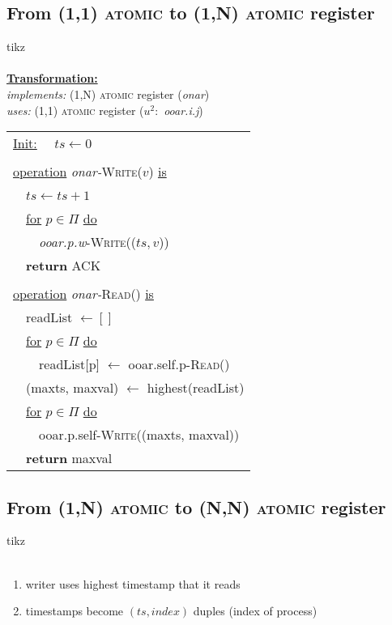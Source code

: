 \documentclass{article}
\begin{document}
\begin{adjustwidth}{2em}{2em}
		\subsection{From (1,1) \textsc{atomic} to (1,N) \textsc{atomic} register}
		\begin{adjustwidth}{2em}{2em}
			tikz \\
			\hfill \\
			\underline{\textbf{Transformation:}} \\
			\textit{implements:} (1,N) \textsc{atomic} register (\textit{onar}) \\
			\textit{uses:} (1,1) \textsc{atomic} register ($u^2 :$ \textit{ooar.i.j}) \\
			\begin{tabular}{l}
				\underline{Init:}
				\ \ $ts \leftarrow 0$ \\
				\\
				\underline{operation} \textit{onar-}\textsc{Write}($v$) \underline{is} \\
				\ \ $ts \leftarrow ts + 1$ \\
				\ \ \underline{for} $p \in \Pi$ \underline{do} \\
				\ \ \ \ \textit{ooar.p.w}-\textsc{Write}(($ts,v$)) \\
				\ \ \textbf{return} \textsc{ACK} \\
				\\
				\underline{operation} \textit{onar-}\textsc{Read}() \underline{is} \\
				\ \ readList $\leftarrow []$ \\
				\ \ \underline{for} $p \in \Pi$ \underline{do} \\
				\ \ \ \ readList[p] $\leftarrow$ ooar.self.p-\textsc{Read}() \\
				\ \ (maxts, maxval) $\leftarrow$ highest(readList) \\
				\ \ \underline{for} $p \in \Pi$ \underline{do} \\
				\ \ \ \ ooar.p.self-\textsc{Write}((maxts, maxval)) \\
				\ \ \textbf{return} maxval
			\end{tabular}
		\end{adjustwidth}
		\subsection{From (1,N) \textsc{atomic} to (N,N) \textsc{atomic} register}
		\begin{adjustwidth}{2em}{2em}
			tikz \\
			\hfill \\
			\begin{enumerate}[-]
				\item writer uses highest timestamp that it reads
				\item timestamps become $(ts, \textit{index})$ duples (index of process)
			\end{enumerate}
		\end{adjustwidth}

\end{adjustwidth}
\end{document}
